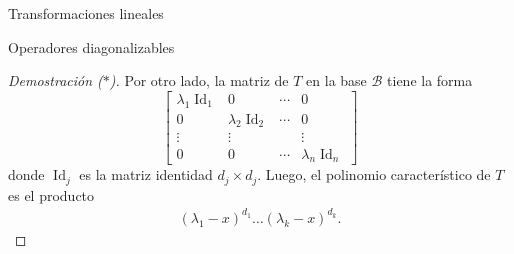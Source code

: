 \documentclass[a4paper,12pt,twoside,spanish,reqno]{amsbook}
\numberwithin{equation}{section}
\theoremstyle{definition}
\theoremstyle{remark}
\newcommand{\Id}{\operatorname{Id}}
\begin{document}
\begin{chapter}{Transformaciones lineales}
\begin{section}{Operadores diagonalizables}
\begin{proof}[Demostración ($*$)]
            Por otro lado, la matriz de $T$ en la base $\mathcal{B}$ tiene la forma
            \begin{equation*}
                \begin{bmatrix}
                \lambda_1 \Id_1 &0&\cdots&0 \\0&\lambda_2 \Id_2&\cdots&0 \\\vdots&\vdots&&\vdots \\0&0&\cdots&\lambda_n \Id_n 
                \end{bmatrix}
            \end{equation*}
            donde $\Id_j$ es la matriz identidad $d_j \times d_j$. Luego,  el polinomio característico de $T$ es el producto
            \begin{align*}
                (\lambda_1 -x)^{d_1}\ldots(\lambda_k- x)^{d_k}.
            \end{align*}
        \end{proof}
    

\end{section}
\end{chapter}
\end{document}
